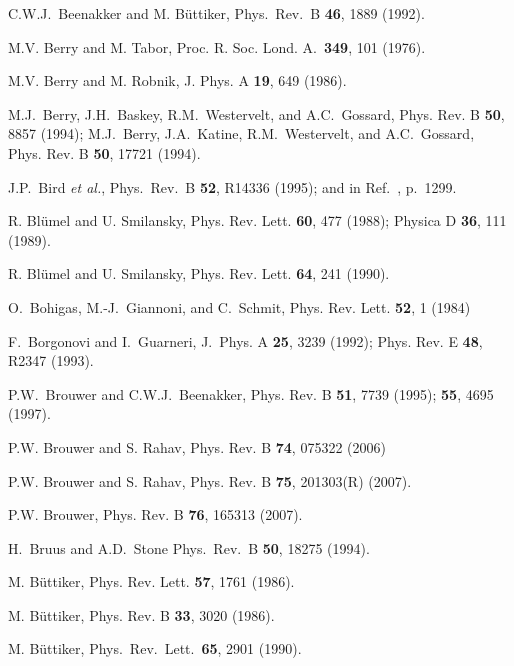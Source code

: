 \documentclass[a4paper,10pt]{article}
\begin{document}
\begin{thebibliography}{Cucc~02b}
C.W.J.~Beenakker and M. B\"{u}ttiker,
Phys.\ Rev.\ B {\bf 46}, 1889 (1992).

M.V. Berry and M. Tabor, Proc. R. Soc. Lond. A.~{\bf 349}, 101 (1976).

M.V. Berry and M. Robnik, J. Phys. A {\bf 19}, 649 (1986).

M.J.~Berry, J.H.~Baskey, R.M.~Westervelt, and
A.C.~Gossard, Phys. Rev. B {\bf 50}, 8857 (1994); M.J.~Berry, 
J.A.~Katine, R.M.~Westervelt, and A.C.~Gossard, Phys. Rev. B 
{\bf 50}, 17721 (1994).

J.P.~Bird {\em et al.},  Phys.\ Rev.\ B {\bf 52}, 
R14336 (1995); and in Ref.~\cite{csf}, p.~1299.

R. Bl\"umel and U. Smilansky, Phys. Rev. Lett.  {\bf 60}, 477 (1988);
Physica D {\bf 36}, 111 (1989).

R. Bl\"umel and U. Smilansky, Phys. Rev. Lett.  {\bf 64},
241 (1990).

O.~Bohigas, M.-J.~Giannoni, and C.~Schmit, Phys. Rev. Lett. {\bf 52}, 1 
(1984)

F.~Borgonovi and I.~Guarneri, J.~Phys. A {\bf 25}, 
3239 (1992); Phys. Rev. E {\bf 48}, R2347 (1993).

P.W.~Brouwer and C.W.J.~Beenakker, 
Phys. Rev. B {\bf 51}, 7739 (1995); {\bf 55}, 4695 (1997).

P.W. Brouwer and S. Rahav, Phys. Rev. B {\bf 74}, 075322 (2006)

 P.W. Brouwer and S. Rahav, Phys. Rev. B {\bf 75}, 201303(R) (2007).

 P.W. Brouwer, Phys. Rev. B {\bf 76}, 165313 (2007).

H.~Bruus  and A.D.~Stone Phys.\ Rev.\ B {\bf 50}, 18275 (1994).

M. B\"uttiker, Phys. Rev. Lett. {\bf 57}, 1761 (1986).

M. B\"uttiker, Phys. Rev. B {\bf 33}, 3020 (1986).

M. B\"{u}ttiker, Phys.\ Rev.\ Lett.\ {\bf 65}, 2901 (1990).


\end{thebibliography}
\end{document}
